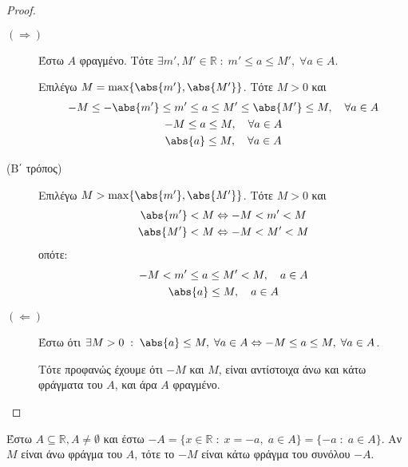 \documentclass[main.tex]{subfiles}
\begin{document}
\begin{proof}
\item {}
    \begin{description}
        \item [$ (\Rightarrow) $] Έστω $A$ φραγμένο. Τότε 
            $ \exists m',M' \in \mathbb{R} \; : \; m' \leq a \leq M', \; 
            \forall a \in A $.

            Επιλέγω $ M = \max \{ \abs{m'}, \abs{M'} \} $. Τότε $ M >0 $ και 
            \begin{gather*}
                -M \leq - \abs{m'} \leq m' \leq a \leq M' \leq \abs{M'} 
                \leq M, \quad \forall a \in A \\
                -M \leq a \leq M, \quad \forall a \in A \\
                \abs{a} \leq M, \quad \forall a \in A
            \end{gather*}

        \item [(Β΄ τρόπος)]
            Επιλέγω $ M > \max \{ \abs{m'}, \abs{M'} \} $. Τότε $ M >0 $ και 
            \begin{gather*}
                \abs{m'} < M \Leftrightarrow - M < m' < M \\
                \abs{M'} < M \Leftrightarrow -M < M' < M 
            \end{gather*}
            οπότε: 
            \begin{gather*}
                -M < m' \leq a \leq M' < M, \quad a \in A \\
                \abs{a} \leq M, \quad a \in A
            \end{gather*}


        \item [$ (\Leftarrow) $]
            Έστω ότι $ \exists M>0 \; : \; \abs{a} \leq M, \; \forall a \in 
            A \Leftrightarrow -M \leq a \leq M, \; \forall a \in A$. 

            Τότε προφανώς έχουμε ότι $-M $ και $ M $, 
            είναι αντίστοιχα άνω και κάτω φράγματα του $A$, και άρα $A$ 
            φραγμένο.
    \end{description} 
\end{proof}

\begin{prop}
    Έστω $ A \subseteq \mathbb{R}, A \neq \emptyset $ και έστω 
    $ -A = \{ x \in \mathbb{R} \; : \; x = -a, \; a \in A \} = \{ 
    -a \; : \; a \in A\} $. Αν $M$ είναι άνω φράγμα 
    του $A$, τότε το $ -M $ είναι κάτω φράγμα του συνόλου $ -A $.
\end{prop}
\end{document}
